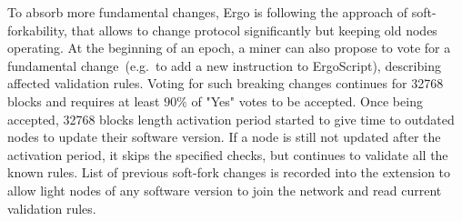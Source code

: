 To absorb more fundamental changes, Ergo is following the approach of soft-forkability, that
allows to change protocol significantly but keeping old nodes operating.
At the beginning of an epoch, a miner can also propose to vote for a fundamental change~(e.g.~to
add a new instruction to ErgoScript), describing affected validation rules.
Voting for such breaking changes continues for 32768 blocks and requires at least $90\%$ of
"Yes" votes to be accepted.
Once being accepted, 32768 blocks length activation period started to give time to outdated
nodes to update their software version.
If a node is still not updated after the activation period, it skips the specified checks,
but continues to validate all the known rules.
List of previous soft-fork changes is recorded into the extension to allow light nodes of
any software version to join the network and read current validation rules.